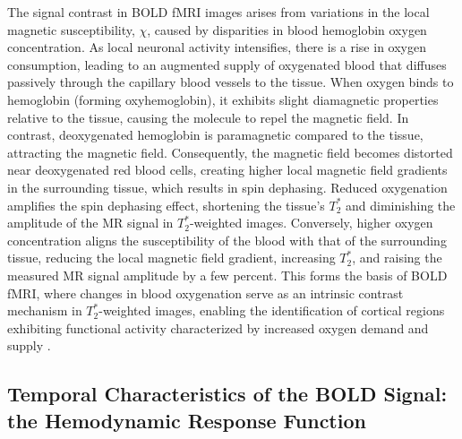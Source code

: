 The signal contrast in BOLD fMRI images arises from variations in the local
magnetic susceptibility, $\chi$, caused by disparities in blood hemoglobin
oxygen concentration. As local neuronal activity intensifies, there is a rise in
oxygen consumption, leading to an augmented supply of oxygenated blood that
diffuses passively through the capillary blood vessels to the tissue. When
oxygen binds to hemoglobin (forming oxyhemoglobin), it exhibits slight
diamagnetic properties relative to the tissue, causing the molecule to repel the
magnetic field. In contrast, deoxygenated hemoglobin is paramagnetic compared to
the tissue, attracting the magnetic field. Consequently, the magnetic field
becomes distorted near deoxygenated red blood cells, creating higher local
magnetic field gradients in the surrounding tissue, which results in spin
dephasing. Reduced oxygenation amplifies the spin dephasing effect, shortening
the tissue's $T_2^*$ and diminishing the amplitude of the MR signal in
$T_2^*$-weighted images. Conversely, higher oxygen concentration aligns the
susceptibility of the blood with that of the surrounding tissue, reducing the
local magnetic field gradient, increasing $T_2^*$, and raising the measured MR
signal amplitude by a few percent. This forms the basis of BOLD fMRI, where
changes in blood oxygenation serve as an intrinsic contrast mechanism in
$T_2^*$-weighted images, enabling the identification of cortical regions
exhibiting functional activity characterized by increased oxygen demand and
supply
\citep{Bandettini1992TimecourseEPI,Belliveau1991FunctionalMappingHuman,Kwong1992Dynamicmagneticresonance,Ogawa1990Brainmagneticresonance,Ogawa1992Intrinsicsignalchanges,Turner1991Echoplanartime}.

\subsection{Temporal Characteristics of the BOLD Signal: the Hemodynamic Response Function}


